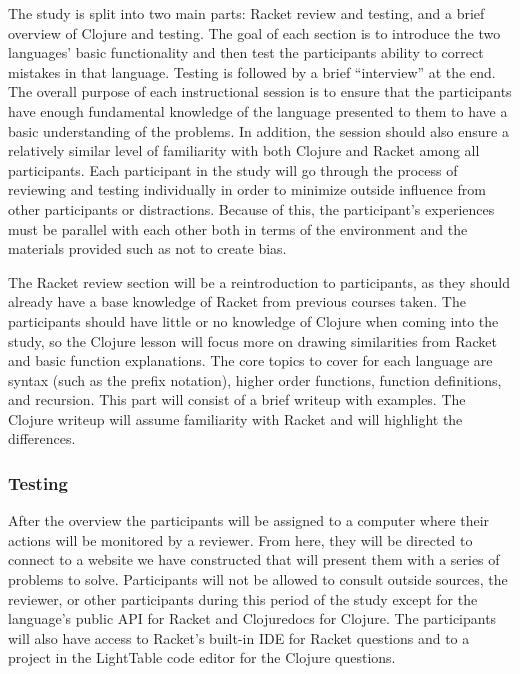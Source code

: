 \documentclass[submission,copyright,creativecommons]{eptcs}
\begin{document}
The study is split into two main parts: Racket review and testing, and a brief overview of Clojure and testing.
The goal of each section is to introduce the two languages' basic functionality and then test the participants ability to correct mistakes in that language.
Testing is followed by a brief ``interview'' at the end. 
The overall purpose of each instructional session is to ensure that the participants have enough fundamental knowledge of the language presented to them to have a basic understanding of the problems. 
In addition, the session should also ensure a relatively similar level of familiarity with both Clojure and Racket among all participants. 
Each participant in the study will go through the process of reviewing and testing individually in order to minimize outside influence from other participants or distractions. 
Because of this, the participant's experiences must be parallel with each other both in terms of the environment and the materials provided such as not to create bias.

The Racket review section will be a reintroduction to participants, as they should already have a base knowledge of Racket from previous courses taken.
The participants should have little or no knowledge of Clojure when coming into the study, so the Clojure lesson will focus more on drawing similarities from Racket and basic function explanations.
The core topics to cover for each language are syntax (such as the prefix notation), higher order functions, function definitions, and recursion.
This part will consist of a brief writeup with examples. The Clojure writeup will assume familiarity with Racket and will highlight the differences. 

\subsubsection{Testing}\label{subsec:testing}

After the overview the participants will be assigned to a computer where their actions will be monitored by a reviewer. 
From here, they will be directed to connect to a website we have constructed that will present them with a series of problems to solve. 
Participants will not be allowed to consult outside sources, the reviewer, or other participants during this period of the study except for the language's public API for Racket and Clojuredocs for Clojure.
The participants will also have access to Racket's built-in IDE for Racket questions and to a project in the LightTable code editor for the Clojure questions. 
\end{document}
